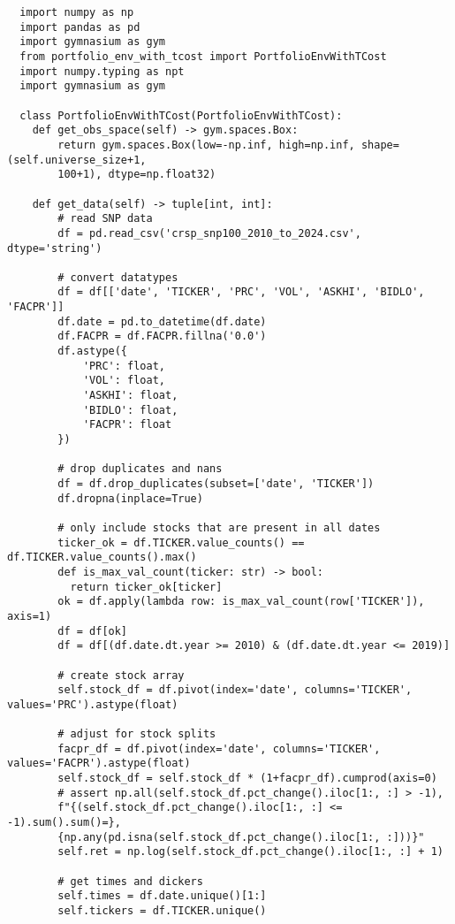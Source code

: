 \begin{verbatim}
  import numpy as np
  import pandas as pd
  import gymnasium as gym
  from portfolio_env_with_tcost import PortfolioEnvWithTCost
  import numpy.typing as npt
  import gymnasium as gym

  class PortfolioEnvWithTCost(PortfolioEnvWithTCost):
    def get_obs_space(self) -> gym.spaces.Box:
        return gym.spaces.Box(low=-np.inf, high=np.inf, shape=(self.universe_size+1, 
        100+1), dtype=np.float32)

    def get_data(self) -> tuple[int, int]:
        # read SNP data
        df = pd.read_csv('crsp_snp100_2010_to_2024.csv', dtype='string')
    
        # convert datatypes
        df = df[['date', 'TICKER', 'PRC', 'VOL', 'ASKHI', 'BIDLO', 'FACPR']]
        df.date = pd.to_datetime(df.date)
        df.FACPR = df.FACPR.fillna('0.0')
        df.astype({
            'PRC': float,
            'VOL': float,
            'ASKHI': float,
            'BIDLO': float,
            'FACPR': float
        })
    
        # drop duplicates and nans
        df = df.drop_duplicates(subset=['date', 'TICKER'])
        df.dropna(inplace=True)
    
        # only include stocks that are present in all dates
        ticker_ok = df.TICKER.value_counts() == df.TICKER.value_counts().max()
        def is_max_val_count(ticker: str) -> bool:
          return ticker_ok[ticker]
        ok = df.apply(lambda row: is_max_val_count(row['TICKER']), axis=1)
        df = df[ok]
        df = df[(df.date.dt.year >= 2010) & (df.date.dt.year <= 2019)]
    
        # create stock array
        self.stock_df = df.pivot(index='date', columns='TICKER', values='PRC').astype(float)
        
        # adjust for stock splits
        facpr_df = df.pivot(index='date', columns='TICKER', values='FACPR').astype(float)
        self.stock_df = self.stock_df * (1+facpr_df).cumprod(axis=0)
        # assert np.all(self.stock_df.pct_change().iloc[1:, :] > -1), 
        f"{(self.stock_df.pct_change().iloc[1:, :] <= -1).sum().sum()=}, 
        {np.any(pd.isna(self.stock_df.pct_change().iloc[1:, :]))}"
        self.ret = np.log(self.stock_df.pct_change().iloc[1:, :] + 1)
    
        # get times and dickers
        self.times = df.date.unique()[1:]
        self.tickers = df.TICKER.unique()
    

\end{verbatim}
